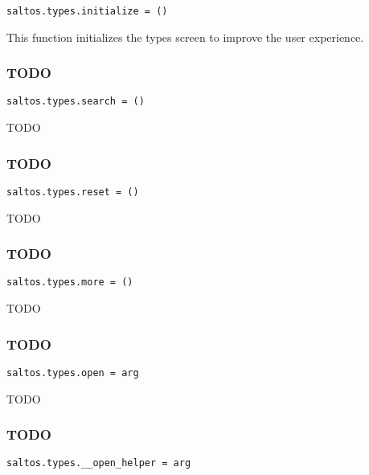 \documentclass[a4paper]{article}
\begin{document}
\begin{lstlisting}
saltos.types.initialize = ()
\end{lstlisting}

This function initializes the types screen to improve the user experience.

\hypertarget{toc110}{}
\subsubsection{TODO}

\begin{lstlisting}
saltos.types.search = ()
\end{lstlisting}

TODO

\hypertarget{toc111}{}
\subsubsection{TODO}

\begin{lstlisting}
saltos.types.reset = ()
\end{lstlisting}

TODO

\hypertarget{toc112}{}
\subsubsection{TODO}

\begin{lstlisting}
saltos.types.more = ()
\end{lstlisting}

TODO

\hypertarget{toc113}{}
\subsubsection{TODO}

\begin{lstlisting}
saltos.types.open = arg
\end{lstlisting}

TODO

\hypertarget{toc114}{}
\subsubsection{TODO}

\begin{lstlisting}
saltos.types.__open_helper = arg
\end{lstlisting}
\end{document}
